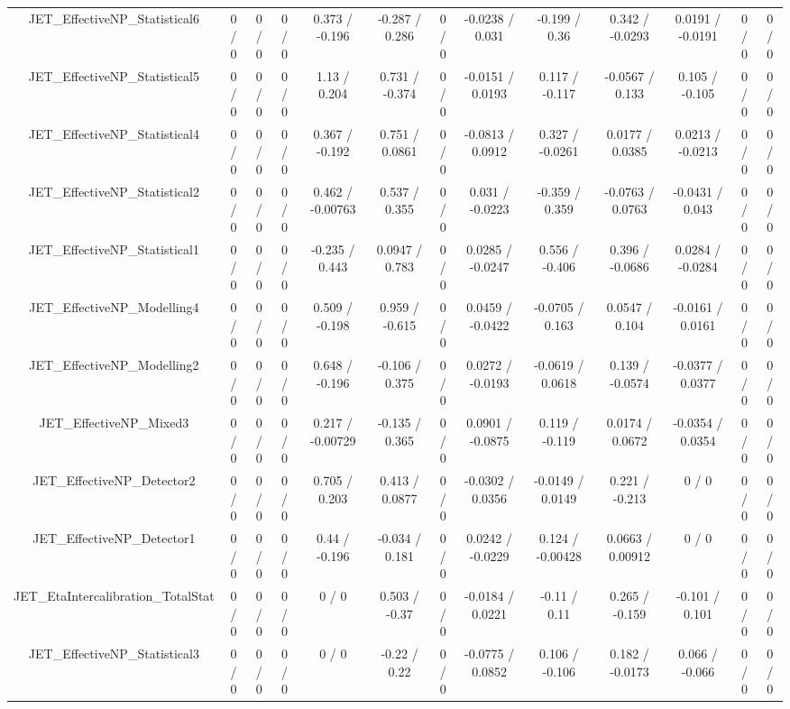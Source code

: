 \documentclass[10pt]{article}
\begin{document}
\begin{table}[htbp]
\begin{center}
\begin{tabular}{|c|c|c|c|c|c|c|c|c|c|c|c|c|}
  JET_EffectiveNP_Statistical6 & 0 / 0 & 0 / 0 & 0 / 0 & 0.373 / -0.196 & -0.287 / 0.286 & 0 / 0 & -0.0238 / 0.031 & -0.199 / 0.36 & 0.342 / -0.0293 & 0.0191 / -0.0191 & 0 / 0 & 0 / 0 \\ 
  JET_EffectiveNP_Statistical5 & 0 / 0 & 0 / 0 & 0 / 0 & 1.13 / 0.204 & 0.731 / -0.374 & 0 / 0 & -0.0151 / 0.0193 & 0.117 / -0.117 & -0.0567 / 0.133 & 0.105 / -0.105 & 0 / 0 & 0 / 0 \\ 
  JET_EffectiveNP_Statistical4 & 0 / 0 & 0 / 0 & 0 / 0 & 0.367 / -0.192 & 0.751 / 0.0861 & 0 / 0 & -0.0813 / 0.0912 & 0.327 / -0.0261 & 0.0177 / 0.0385 & 0.0213 / -0.0213 & 0 / 0 & 0 / 0 \\ 
  JET_EffectiveNP_Statistical2 & 0 / 0 & 0 / 0 & 0 / 0 & 0.462 / -0.00763 & 0.537 / 0.355 & 0 / 0 & 0.031 / -0.0223 & -0.359 / 0.359 & -0.0763 / 0.0763 & -0.0431 / 0.043 & 0 / 0 & 0 / 0 \\ 
  JET_EffectiveNP_Statistical1 & 0 / 0 & 0 / 0 & 0 / 0 & -0.235 / 0.443 & 0.0947 / 0.783 & 0 / 0 & 0.0285 / -0.0247 & 0.556 / -0.406 & 0.396 / -0.0686 & 0.0284 / -0.0284 & 0 / 0 & 0 / 0 \\ 
  JET_EffectiveNP_Modelling4 & 0 / 0 & 0 / 0 & 0 / 0 & 0.509 / -0.198 & 0.959 / -0.615 & 0 / 0 & 0.0459 / -0.0422 & -0.0705 / 0.163 & 0.0547 / 0.104 & -0.0161 / 0.0161 & 0 / 0 & 0 / 0 \\ 
  JET_EffectiveNP_Modelling2 & 0 / 0 & 0 / 0 & 0 / 0 & 0.648 / -0.196 & -0.106 / 0.375 & 0 / 0 & 0.0272 / -0.0193 & -0.0619 / 0.0618 & 0.139 / -0.0574 & -0.0377 / 0.0377 & 0 / 0 & 0 / 0 \\ 
  JET_EffectiveNP_Mixed3 & 0 / 0 & 0 / 0 & 0 / 0 & 0.217 / -0.00729 & -0.135 / 0.365 & 0 / 0 & 0.0901 / -0.0875 & 0.119 / -0.119 & 0.0174 / 0.0672 & -0.0354 / 0.0354 & 0 / 0 & 0 / 0 \\ 
  JET_EffectiveNP_Detector2 & 0 / 0 & 0 / 0 & 0 / 0 & 0.705 / 0.203 & 0.413 / 0.0877 & 0 / 0 & -0.0302 / 0.0356 & -0.0149 / 0.0149 & 0.221 / -0.213 & 0 / 0 & 0 / 0 & 0 / 0 \\ 
  JET_EffectiveNP_Detector1 & 0 / 0 & 0 / 0 & 0 / 0 & 0.44 / -0.196 & -0.034 / 0.181 & 0 / 0 & 0.0242 / -0.0229 & 0.124 / -0.00428 & 0.0663 / 0.00912 & 0 / 0 & 0 / 0 & 0 / 0 \\ 
  JET_EtaIntercalibration_TotalStat & 0 / 0 & 0 / 0 & 0 / 0 & 0 / 0 & 0.503 / -0.37 & 0 / 0 & -0.0184 / 0.0221 & -0.11 / 0.11 & 0.265 / -0.159 & -0.101 / 0.101 & 0 / 0 & 0 / 0 \\ 
  JET_EffectiveNP_Statistical3 & 0 / 0 & 0 / 0 & 0 / 0 & 0 / 0 & -0.22 / 0.22 & 0 / 0 & -0.0775 / 0.0852 & 0.106 / -0.106 & 0.182 / -0.0173 & 0.066 / -0.066 & 0 / 0 & 0 / 0 \\ 

\end{tabular}
\end{center}
\end{table}
\end{document}
